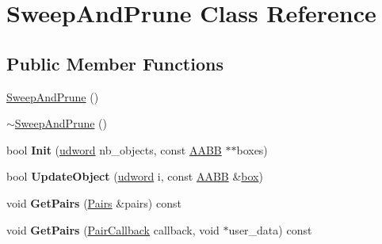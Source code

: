 \hypertarget{class_sweep_and_prune}{\section{Sweep\+And\+Prune Class Reference}
\label{class_sweep_and_prune}
}
\subsection*{Public Member Functions}
\begin{DoxyCompactItemize}
\item 
\hyperlink{class_sweep_and_prune_a4c7f996dd7672c1566a0b3696677cb71}{Sweep\+And\+Prune} ()
\item 
\hyperlink{class_sweep_and_prune_acf571407e5f02c89e80d0ad87f71734a}{$\sim$\+Sweep\+And\+Prune} ()
\item 
\hypertarget{class_sweep_and_prune_a4c144d73e7b6831358d5fa3ccf88b389}{bool {\bfseries Init} (\hyperlink{_ice_types_8h_a44c6f1920ba5551225fb534f9d1a1733}{udword} nb\+\_\+objects, const \hyperlink{class_a_a_b_b}{A\+A\+B\+B} $\ast$$\ast$boxes)}\label{class_sweep_and_prune_a4c144d73e7b6831358d5fa3ccf88b389}

\item 
\hypertarget{class_sweep_and_prune_a75e57fa924b1173bc4f88b372ab1d649}{bool {\bfseries Update\+Object} (\hyperlink{_ice_types_8h_a44c6f1920ba5551225fb534f9d1a1733}{udword} i, const \hyperlink{class_a_a_b_b}{A\+A\+B\+B} \&\hyperlink{structbox}{box})}\label{class_sweep_and_prune_a75e57fa924b1173bc4f88b372ab1d649}

\item 
\hypertarget{class_sweep_and_prune_a9cea180729e3e965ecbc68c086b079ec}{void {\bfseries Get\+Pairs} (\hyperlink{class_pairs}{Pairs} \&pairs) const }\label{class_sweep_and_prune_a9cea180729e3e965ecbc68c086b079ec}

\item 
\hypertarget{class_sweep_and_prune_aaa7080ff61fda85e71ba79f28cbc831d}{void {\bfseries Get\+Pairs} (\hyperlink{_o_p_c___sweep_and_prune_8h_a552f282bdd0f7430b3a85860f75bbec6}{Pair\+Callback} callback, void $\ast$user\+\_\+data) const }\label{class_sweep_and_prune_aaa7080ff61fda85e71ba79f28cbc831d}

\end{DoxyCompactItemize}


